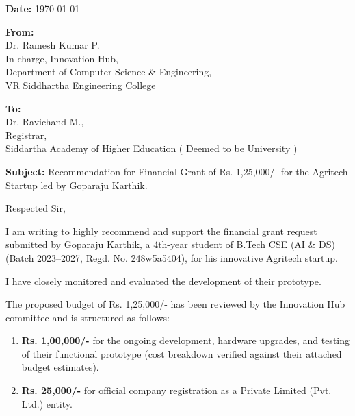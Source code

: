 \documentclass[12pt,a4paper]{article}
\begin{document}
\pagestyle{empty}

\begin{flushright}
    \textbf{Date:} \today \\
\end{flushright}

\begin{flushleft}
    \textbf{From:} \\
    Dr. Ramesh Kumar P. \\
    In-charge, Innovation Hub, \\
    Department of Computer Science \& Engineering, \\
    VR Siddhartha Engineering College \\
    \vspace{0.8em}

    \textbf{To:} \\
    Dr. Ravichand M., \\
    Registrar, \\
    Siddartha Academy of Higher Education ( Deemed to be University ) \\
\end{flushleft}

\vspace{0.5em}

\noindent\textbf{Subject:} Recommendation for Financial Grant of Rs. 1,25,000/- for the Agritech Startup led by Goparaju Karthik.

\vspace{0.8em}

\noindent Respected Sir,

\vspace{0.5em}

I am writing to highly recommend and support the financial grant request submitted by Goparaju Karthik, a 4th-year student of B.Tech CSE (AI \& DS) (Batch 2023--2027, Regd. No. 248w5a5404), for his innovative Agritech startup.

I have closely monitored and evaluated the development of their prototype.

The proposed budget of Rs. 1,25,000/- has been reviewed by the Innovation Hub committee and is structured as follows:
\begin{enumerate}
    \item \textbf{Rs. 1,00,000/-} for the ongoing development, hardware upgrades, and testing of their functional prototype (cost breakdown verified against their attached budget estimates).
    \item \textbf{Rs. 25,000/-} for official company registration as a Private Limited (Pvt. Ltd.) entity.
\end{enumerate}
\end{document}
